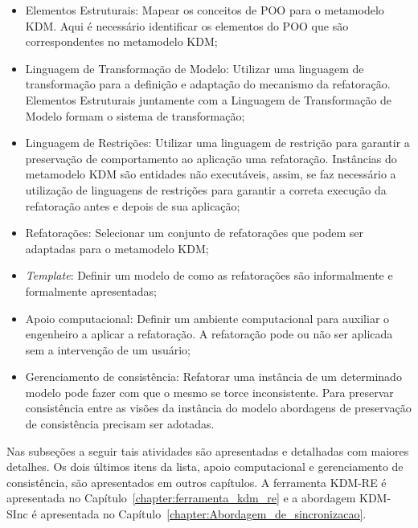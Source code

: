 \begin{itemize}
\item Elementos Estruturais: Mapear os conceitos de POO para o metamodelo KDM.
Aqui é necessário identificar os elementos do POO que são correspondentes no metamodelo KDM;
\item Linguagem de Transformação de Modelo: Utilizar uma linguagem de transformação para a definição e adaptação do mecanismo da refatoração. Elementos Estruturais juntamente com a Linguagem de Transformação de Modelo formam o sistema de transformação;
\item Linguagem de Restrições: Utilizar uma linguagem de restrição para garantir a preservação de comportamento ao aplicação uma refatoração. Instâncias do metamodelo KDM são entidades não executáveis, assim, se faz necessário a utilização de linguagens de restrições para garantir a correta execução da refatoração antes e depois de sua aplicação;
\item Refatorações: Selecionar um conjunto de refatorações que podem ser adaptadas para o metamodelo KDM;
\item \textit{Template}: Definir um modelo de como as refatorações são informalmente e formalmente apresentadas;
\item Apoio computacional: Definir um ambiente computacional para auxiliar o engenheiro a aplicar a refatoração. A refatoração pode ou não ser aplicada sem a intervenção de um usuário;
\item Gerenciamento de consistência: Refatorar uma instância de um determinado modelo pode fazer com que o mesmo se torce inconsistente. Para preservar consistência entre as visões da instância do modelo abordagens de preservação de consistência precisam ser adotadas.
\end{itemize}

Nas subseções a seguir tais atividades são apresentadas e detalhadas com maiores detalhes. Os dois últimos itens da lista, apoio computacional e gerenciamento de consistência, são apresentados em outros capítulos. A ferramenta KDM-RE é apresentada no Capítulo~\ref{chapter:ferramenta_kdm_re} e a abordagem KDM-SInc é apresentada no Capítulo~\ref{chapter:Abordagem_de_sincronizacao}.


